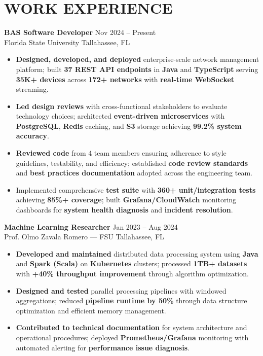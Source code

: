 \documentclass[letterpaper,10pt]{article}
\newcommand{\resumeItem}[1]{\item\small #1}
\newcommand{\resumeSubheading}[4]{
  \vspace{6pt}
  \noindent
  \textbf{#1} \hfill {\footnotesize #2} \\
  [-1pt]
  \noindent
  \small #3 \hfill {\small #4}
  \vspace{3pt}
}
\newcommand{\resumeItemsStart}{\vspace{-2pt}\begin{itemize}}
\newcommand{\resumeItemsEnd}{\end{itemize}\vspace{6pt}}
\begin{document}
\section{\textcolor{metablue}{WORK EXPERIENCE}}
\vspace{-12pt}

\resumeSubheading
{BAS Software Developer}{Nov 2024 -- Present}
{Florida State University}{Tallahassee, FL}
\resumeItemsStart
\resumeItem{\textbf{Designed, developed, and deployed} enterprise-scale network management platform; built \textbf{37 REST API endpoints} in \textbf{Java} and \textbf{TypeScript} serving \textbf{35K+ devices} across \textbf{172+ networks} with \textbf{real-time WebSocket} streaming.}
\resumeItem{\textbf{Led design reviews} with cross-functional stakeholders to evaluate technology choices; architected \textbf{event-driven microservices} with \textbf{PostgreSQL}, \textbf{Redis} caching, and \textbf{S3} storage achieving \textbf{99.2\% system accuracy}.}
\resumeItem{\textbf{Reviewed code} from 4 team members ensuring adherence to style guidelines, testability, and efficiency; established \textbf{code review standards} and \textbf{best practices documentation} adopted across the engineering team.}
\resumeItem{Implemented comprehensive \textbf{test suite} with \textbf{360+ unit/integration tests} achieving \textbf{85\%+ coverage}; built \textbf{Grafana/CloudWatch} monitoring dashboards for \textbf{system health diagnosis} and \textbf{incident resolution}.}
\resumeItemsEnd
\vspace{-12pt}

\resumeSubheading
{Machine Learning Researcher}{Jan 2023 -- Aug 2024}
{Prof. Olmo Zavala Romero — FSU}{Tallahassee, FL}
\resumeItemsStart
\resumeItem{\textbf{Developed and maintained} distributed data processing system using \textbf{Java} and \textbf{Spark (Scala)} on \textbf{Kubernetes} clusters; processed \textbf{1TB+ datasets} with \textbf{+40\% throughput improvement} through algorithm optimization.}
\resumeItem{\textbf{Designed and tested} parallel processing pipelines with windowed aggregations; reduced \textbf{pipeline runtime by 50\%} through data structure optimization and efficient memory management.}
\resumeItem{\textbf{Contributed to technical documentation} for system architecture and operational procedures; deployed \textbf{Prometheus/Grafana} monitoring with automated alerting for \textbf{performance issue diagnosis}.}
\resumeItemsEnd
\vspace{-12pt}
\end{document}
